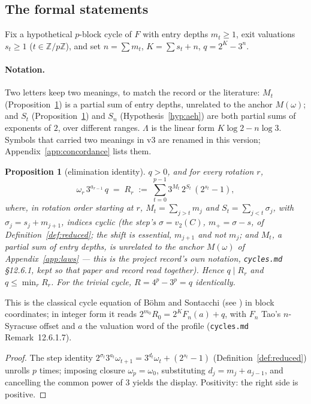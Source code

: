 \documentclass[11pt]{article}
\newtheorem{proposition}[theorem]{Proposition}
\theoremstyle{remark}
\newcommand{\Z}{\mathbb{Z}}
\newcommand{\vt}[1]{v_2\!\left(#1\right)}
\newcommand{\w}{\omega}
\begin{document}
\subsection*{The formal statements}

Fix a hypothetical $p$-block cycle of $F$ with entry depths $m_t \ge 1$, exit valuations $s_t \ge 1$ ($t \in \Z/p\Z$), and set $n = \sum m_t$, $K = \sum s_t + n$, $q = 2^K - 3^n$.

\paragraph{Notation.} Two letters keep two meanings, to match the record or the literature: $M_t$ (Proposition~\ref{prop:elim}) is a partial sum of entry depths, unrelated to the anchor $M(\w)$; and $S_t$ (Proposition~\ref{prop:elim}) and $S_n$ (Hypothesis~\ref{hyp:aeh}) are both partial sums of exponents of $2$, over different ranges. $\Lambda$ is the linear form $K\log 2 - n\log 3$. Symbols that carried two meanings in v3 are renamed in this version; Appendix~\ref{app:concordance} lists them.

\begin{proposition}[elimination identity]\label{prop:elim}
$q > 0$, and for every rotation $r$,
\[ \w_r\, 3^{a_{r-1}}\, q \;=\; R_r \;:=\; \sum_{t=0}^{p-1} 3^{M_t}\, 2^{S_t}\,(2^{s_t}-1), \]
where, in rotation order starting at $r$, $M_t = \sum_{j>t} m_j$ and $S_t = \sum_{j<t}\sigma_j$, with $\sigma_j = s_j + m_{j+1}$, indices cyclic (the step's $\sigma = \vt{C}$, $m_+ = \sigma - s$, of Definition~\ref{def:reduced}; the shift is essential, $m_{j+1}$ and not $m_j$; and $M_t$, a partial sum of entry depths, is unrelated to the anchor $M(\w)$ of Appendix~\ref{app:laws} --- this is the project record's own notation, \texttt{cycles.md} \S12.6.1, kept so that paper and record read together). Hence $q \mid R_r$ and $q \le \min_r R_r$. For the trivial cycle, $R = 4^p - 3^p = q$ identically.
\end{proposition}

This is the classical cycle equation of B\"ohm and Sontacchi \cite{bohm} (see \cite[I, item~26]{lagarias}) in block coordinates; in integer form it reads $2^{m_0}R_0 = 2^K F_n(a) + q$, with $F_n$ Tao's $n$-Syracuse offset \cite[(1.5)]{tao} and $a$ the valuation word of the profile (\texttt{cycles.md} Remark~12.6.1.7).

\begin{proof}
The step identity $2^{\sigma_t}3^{a_t}\w_{t+1} = 3^{d_t}\w_t + (2^{s_t}-1)$ (Definition~\ref{def:reduced}) unrolls $p$ times; imposing closure $\w_p = \w_0$, substituting $d_j = m_j + a_{j-1}$, and cancelling the common power of $3$ yields the display. Positivity: the right side is positive.
\end{proof}
\end{document}
